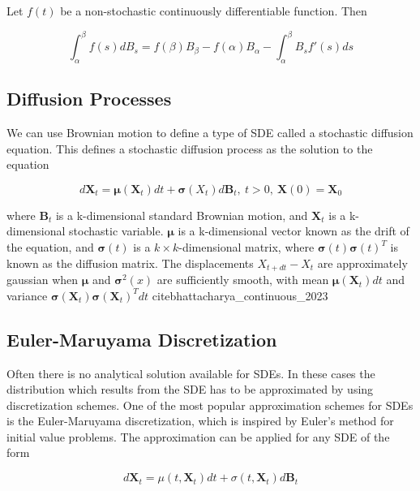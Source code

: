 \cite{iacus_simulation_2008}


Let $f(t)$ be a non-stochastic continuously differentiable function. Then

$$\int_\alpha^\beta f(s)dB_s = f(\beta)B_\beta - f(\alpha)B_\alpha - \int_\alpha^\beta B_sf'(s) ds   $$



\subsection{Diffusion Processes}

We can use Brownian motion to define a type of SDE called a stochastic diffusion equation. This defines a stochastic diffusion process as the solution to the equation

\begin{equation}
    d{\textbf{X}}_t = {\pmb{\mu}} ({\textbf{X}}_t )dt + \pmb{\sigma}({X}_t ) d\textbf{B}_t, \   t > 0 , \ \textbf{X}(0) = \textbf{X}_0
\end{equation}

where $\textbf{B}_t$ is a k-dimensional standard Brownian motion, and $\textbf{X}_t$ is a k-dimensional stochastic variable. $\pmb{\mu}$ is a k-dimensional vector known as the drift of the equation, and $\pmb{\sigma}(t)$ is a $k\times k$-dimensional matrix, where $\pmb{\sigma}(t)\pmb{\sigma}(t)^T$ is known as the diffusion matrix. The displacements $X_{t+dt} - X_t$ are approximately gaussian when $\pmb{\mu}$ and $\pmb{\sigma}^2(x)$ are sufficiently smooth, with mean $\pmb{\mu}(\textbf{X}_t)dt$ and variance $\pmb{\sigma}(\textbf{X}_t)\pmb{\sigma}(\textbf{X}_t)^Tdt$ cite{bhattacharya_continuous_2023}




\subsection{Euler-Maruyama  Discretization}
\label{Euler-Maruyama}
Often there is no analytical solution available for SDEs. In these cases the distribution which results from the SDE has to be approximated by using discretization schemes.  One of the most popular approximation schemes for SDEs is the Euler-Maruyama discretization, which is inspired by Euler's method for initial value problems. The approximation can be applied for any SDE of the form

\begin{equation}
    d\textbf{X}_t = \mu(t, \textbf{X}_t)dt + \sigma(t, \textbf{X}_t)d\textbf{B}_t
\end{equation}


